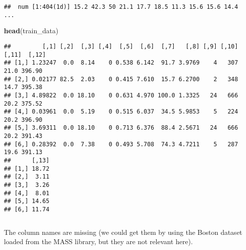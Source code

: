 \documentclass[10pt,ignorenonframetext,]{beamer}
\newenvironment{Shaded}{\begin{snugshade}}{\end{snugshade}}
\newcommand{\KeywordTok}[1]{\textcolor[rgb]{0.13,0.29,0.53}{\textbf{#1}}}
\newcommand{\NormalTok}[1]{#1}
\newcommand{\OperatorTok}[1]{\textcolor[rgb]{0.81,0.36,0.00}{\textbf{#1}}}
\newcommand{\StringTok}[1]{\textcolor[rgb]{0.31,0.60,0.02}{#1}}
\begin{document}
\begin{frame}[fragile]

\scriptsize

\begin{Shaded}
\end{Shaded}

\begin{verbatim}
##  num [1:404(1d)] 15.2 42.3 50 21.1 17.7 18.5 11.3 15.6 15.6 14.4 ...
\end{verbatim}

\begin{Shaded}
\begin{Highlighting}[]
\KeywordTok{head}\NormalTok{(train_data)}
\end{Highlighting}
\end{Shaded}

\begin{verbatim}
##         [,1] [,2]  [,3] [,4]  [,5]  [,6]  [,7]   [,8] [,9] [,10] [,11]  [,12]
## [1,] 1.23247  0.0  8.14    0 0.538 6.142  91.7 3.9769    4   307  21.0 396.90
## [2,] 0.02177 82.5  2.03    0 0.415 7.610  15.7 6.2700    2   348  14.7 395.38
## [3,] 4.89822  0.0 18.10    0 0.631 4.970 100.0 1.3325   24   666  20.2 375.52
## [4,] 0.03961  0.0  5.19    0 0.515 6.037  34.5 5.9853    5   224  20.2 396.90
## [5,] 3.69311  0.0 18.10    0 0.713 6.376  88.4 2.5671   24   666  20.2 391.43
## [6,] 0.28392  0.0  7.38    0 0.493 5.708  74.3 4.7211    5   287  19.6 391.13
##      [,13]
## [1,] 18.72
## [2,]  3.11
## [3,]  3.26
## [4,]  8.01
## [5,] 14.65
## [6,] 11.74
\end{verbatim}

\(~\)

\normalsize

The column names are missing (we could get them by using the Boston
dataset loaded from the MASS library, but they are not relevant here).

\end{frame}
\end{document}

